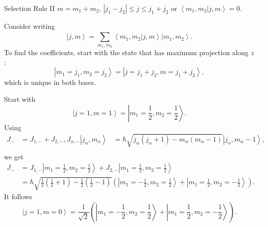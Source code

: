 \documentclass[phys334]{subfiles}
\begin{document}
    \begin{fact}{Selection Rule II}
        $m = m_1+m_2$, $\left| j_1-j_2 \right|\leq j\leq j_1+j_2$ or $\left\langle m_1,m_2 | j,m \right\rangle = 0$.
    \end{fact}

    \np Consider writing
    \begin{equation*}
        \left| j,m \right\rangle = \sum^{}_{m_1,m_2} \left\langle m_1,m_2 | j,m \right\rangle\left| m_1,m_2 \right\rangle.
    \end{equation*}
    To find the coefficients, start with the state that has maximum projection along $z$:
    \begin{equation*}
        \left| m_1=j_1,m_2=j_2 \right\rangle = \left| j=j_1+j_2, m=j_1+j_2 \right\rangle,
    \end{equation*}
    which is unique in both bases.

    \np Start with
    \begin{equation*}
        \left| j=1,m=1 \right\rangle = \left| m_1=\frac{1}{2},m_2=\frac{1}{2} \right\rangle.
    \end{equation*}
    Using
    \begin{equation*}
        \begin{aligned}
            J_- & = J_{1,-} + J_{2,-} ,
            J_{\alpha,-}\left| j_{\alpha},m_{\alpha} \right\rangle & = \hbar\sqrt{j_{\alpha}\left( j_{\alpha}+1 \right)-m_{\alpha}\left( m_{\alpha}-1 \right)} \left| j_{\alpha},m_{\alpha}-1 \right\rangle, \\
        \end{aligned} 
    \end{equation*}
    we get
    \begin{equation*}
        \begin{aligned}
            J_{-} & = J_{1,-}\left| m_1=\frac{1}{2},m_2=\frac{1}{2} \right\rangle + J_{2,-}\left| m_1=\frac{1}{2},m_2=\frac{1}{2} \right\rangle  \\
                  & = \hbar\sqrt{\frac{1}{2}\left( \frac{1}{2}+1 \right)-\frac{1}{2}\left( \frac{1}{2}-1 \right)}\left( \left| m_1=-\frac{1}{2},m_2=\frac{1}{2} \right\rangle+\left| m_1=\frac{1}{2},m_2=-\frac{1}{2} \right\rangle \right).
        \end{aligned} 
    \end{equation*}
    It follows
    \begin{equation*}
        \left| j=1,m=0 \right\rangle = \frac{1}{\sqrt{2}} \left( \left| m_1=-\frac{1}{2},m_2=\frac{1}{2} \right\rangle+\left| m_1=\frac{1}{2},m_2=-\frac{1}{2} \right\rangle \right).
    \end{equation*}





























    
    
    
    
    
    
    
    
    
\end{document}

